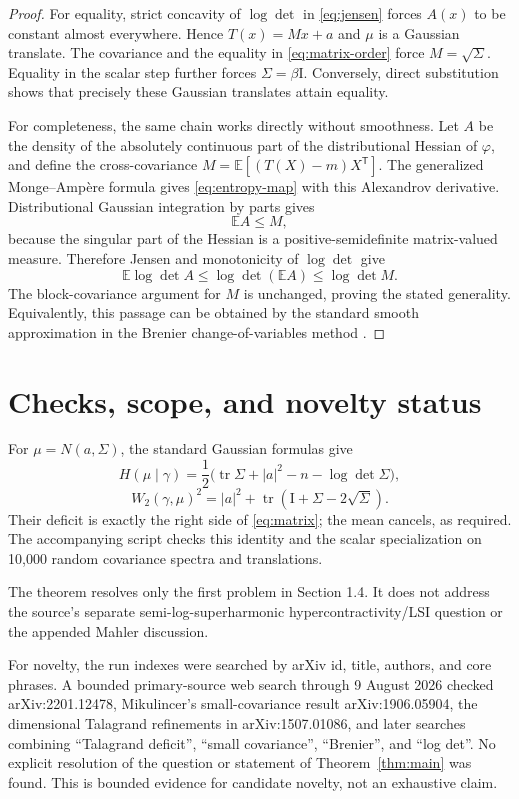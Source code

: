 \documentclass[11pt]{article}
\newcommand{\E}{\mathbb E}
\newcommand{\tr}{\operatorname{tr}}
\newcommand{\Id}{\mathrm I}
\begin{document}
\begin{proof}
For equality, strict concavity of $\log\det$ in \eqref{eq:jensen} forces
$A(x)$ to be constant almost everywhere.  Hence $T(x)=Mx+a$ and $\mu$ is a
Gaussian translate.  The covariance and the equality in
\eqref{eq:matrix-order} force $M=\sqrt\Sigma$.  Equality in the scalar step
further forces $\Sigma=\beta\Id$.  Conversely, direct substitution shows
that precisely these Gaussian translates attain equality.

For completeness, the same chain works directly without smoothness.  Let
$A$ be the density of the absolutely continuous part of the distributional
Hessian of $\varphi$, and define the cross-covariance
$M=\E[(T(X)-m)X^{\mathsf T}]$.  The generalized Monge--Amp\`ere formula gives
\eqref{eq:entropy-map} with this Alexandrov derivative.  Distributional
Gaussian integration by parts gives
\[
 \E A\leq M,
\]
because the singular part of the Hessian is a positive-semidefinite
matrix-valued measure.  Therefore Jensen and monotonicity of $\log\det$ give
\[
 \E\log\det A\leq\log\det(\E A)\leq\log\det M.
\]
The block-covariance argument for $M$ is unchanged, proving the stated
generality.  Equivalently, this passage can be obtained by the standard smooth
approximation in the Brenier change-of-variables method
\cite[Chapter 10]{Villani}.
\end{proof}

\section{Checks, scope, and novelty status}

For $\mu=N(a,\Sigma)$, the standard Gaussian formulas give
\[
 H(\mu\mid\gamma)
 =\frac12\bigl(\tr\Sigma+|a|^2-n-\log\det\Sigma\bigr),
\]
\[
 W_2(\gamma,\mu)^2
 =|a|^2+\tr(\Id+\Sigma-2\sqrt\Sigma).
\]
Their deficit is exactly the right side of \eqref{eq:matrix}; the mean cancels,
as required.  The accompanying script checks this identity and the scalar
specialization on 10,000 random covariance spectra and translations.

The theorem resolves only the first problem in Section 1.4.  It does not
address the source's separate semi-log-superharmonic hypercontractivity/LSI
question or the appended Mahler discussion.

For novelty, the run indexes were searched by arXiv id, title, authors, and
core phrases.  A bounded primary-source web search through 9 August 2026
checked arXiv:2201.12478, Mikulincer's small-covariance result
arXiv:1906.05904, the dimensional Talagrand refinements in arXiv:1507.01086,
and later searches combining ``Talagrand deficit'', ``small covariance'',
``Brenier'', and ``log det''.  No explicit resolution of the question or
statement of Theorem~\ref{thm:main} was found.  This is bounded evidence for
candidate novelty, not an exhaustive claim.
\end{document}
